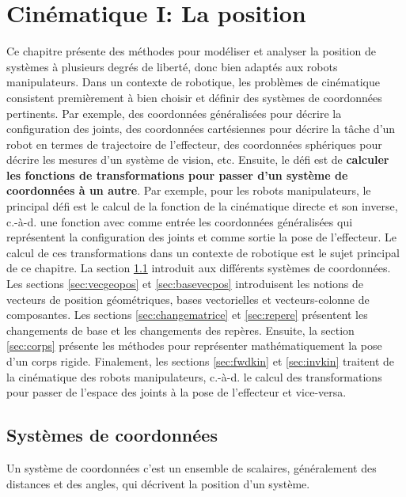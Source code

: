\chapter{Cinématique I: La position}
\label{sec:cine1}

Ce chapitre présente des méthodes pour modéliser et analyser la position de systèmes à plusieurs degrés de liberté, donc bien adaptés aux robots manipulateurs. Dans un contexte de robotique, les problèmes de cinématique consistent premièrement à bien choisir et définir des systèmes de coordonnées pertinents. Par exemple, des coordonnées généralisées pour décrire la configuration des joints, des coordonnées cartésiennes pour décrire la tâche d'un robot en termes de trajectoire de l'effecteur, des coordonnées sphériques pour décrire les mesures d'un système de vision, etc. Ensuite, le défi est de \textbf{calculer les fonctions de transformations pour passer d'un système de coordonnées à un autre}. Par exemple, pour les robots manipulateurs, le principal défi est le calcul de la fonction de la cinématique directe et son inverse, c.-à-d. une fonction avec comme entrée les coordonnées généralisées qui représentent la configuration des joints et comme sortie la pose de l'effecteur. Le calcul de ces transformations dans un contexte de robotique est le sujet principal de ce chapitre. La section \ref{sec:syscoord} introduit aux différents systèmes de coordonnées. Les sections \ref{sec:vecgeopos} et \ref{sec:basevecpos} introduisent les notions de vecteurs de position géométriques, bases vectorielles et vecteurs-colonne de composantes. Les sections \ref{sec:changematrice} et \ref{sec:repere} présentent les changements de base et les changements des repères. Ensuite, la section \ref{sec:corps} présente les méthodes pour représenter mathématiquement la pose d'un corps rigide. Finalement, les sections \ref{sec:fwdkin} et \ref{sec:invkin} traitent de la cinématique des robots manipulateurs, c.-à-d. le calcul des transformations pour passer de l'espace des joints à la pose de l'effecteur et vice-versa.





\section{Systèmes de coordonnées}
\label{sec:syscoord}

Un système de coordonnées c'est un ensemble de scalaires, généralement des distances et des angles, qui décrivent la position d'un système.

